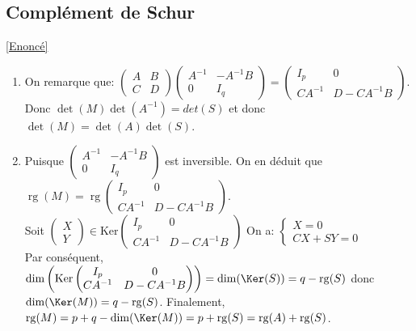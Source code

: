 \documentclass[8pt]{book}
\begin{document}
	\subsection{Complément de Schur }
	\label{Complément de Schur corrigé}
	\textcolor{blue}{\hyperref[Complément de Schur]{[Enoncé]}}\\
	\begin{enumerate}
		\item On remarque que: $\begin{pmatrix}A &B \\C &D\end{pmatrix}\begin{pmatrix}
			A^{-1}& -A^{-1}B\\ 0 & I_q
		\end{pmatrix}=\begin{pmatrix}
			I_p &0\\CA^{-1} & D-CA^{-1}B
		\end{pmatrix}$.
		Donc $\det(M)\det(A^{-1})=det(S)$ et donc $\det(M)=\det(A)\det(S)$.
		\item Puisque $\begin{pmatrix}
			A^{-1}& -A^{-1}B\\ 0 & I_q \end{pmatrix}$ est inversible. On en déduit que $\operatorname{rg}(M)=\operatorname{rg}\begin{pmatrix}
			I_p &0\\CA^{-1} & D-CA^{-1}B
		\end{pmatrix}$.
		\\Soit $\begin{pmatrix}
			X \\Y 
		\end{pmatrix}\in\text{Ker}\begin{pmatrix}
			I_p &0\\CA^{-1} & D-CA^{-1}B
		\end{pmatrix}$
		On a: $\begin{cases}
			X=0 \\
			CX+SY=0
		\end{cases}$\\
		Par conséquent, $\dim\left(\text{Ker}\begin{pmatrix}
			I_p &0\\CA^{-1} & D-CA^{-1}B
		\end{pmatrix}\right)=\dim(\Ker(S))=q-\operatorname{rg}(S)$ donc $\dim(\Ker(M))=q-\operatorname{rg}(S)$.
		Finalement, $\operatorname{rg}(M)=p+q-\dim(\Ker(M))=p+\operatorname{rg}(S)=\operatorname{rg}(A)+\operatorname{rg}(S)$.
	\end{enumerate}
	
\end{document}
